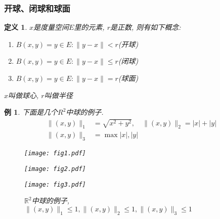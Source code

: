 \documentclass{book}
\newtheorem{definition}{\hspace{2em}定义}[section]
\newtheorem{example}{例}[section]
\begin{document}
\subsubsection*{开球、闭球和球面}
\begin{definition}
  $x$是度量空间$E$里的元素, $r$是正数, 则有如下概念:
  \begin{enumerate}
    \item $B(x,y)={y\in E:\|y-x\|<r}$(开球)
    \item $B(x,y)={y\in E:\|y-x\|\leq r}$(闭球)
    \item $B(x,y)={y\in E:\|y-x\|=r}$(球面)
  \end{enumerate}
  $x$叫做球心, $r$叫做半径
\end{definition}
\begin{example}
  下面是几个$R^2$中球的例子.
  \begin{equation*}
    \begin{split}
       \|(x,y)\|_1 & =\sqrt{x^2+y^2},\quad\|(x,y)\|_2=|x|+|y| \\
       \|(x,y)\|_3 & =\max{|x|,|y|}
    \end{split}
  \end{equation*}
\begin{figure}[H]
  \centering
  \begin{minipage}{3cm}
    \texttt{[image: fig1.pdf]}
  \end{minipage}
  \begin{minipage}{3cm}
    \texttt{[image: fig2.pdf]}
  \end{minipage}
  \begin{minipage}{3cm}
    \texttt{[image: fig3.pdf]}
  \end{minipage}
  \caption{$\mathbb{R}^2$中球的例子, $\|(x,y)\|_1\leq1, \|(x,y)\|_2\leq1, \|(x,y)\|_3\leq1$}
\end{figure}
\end{example}
\end{document}

